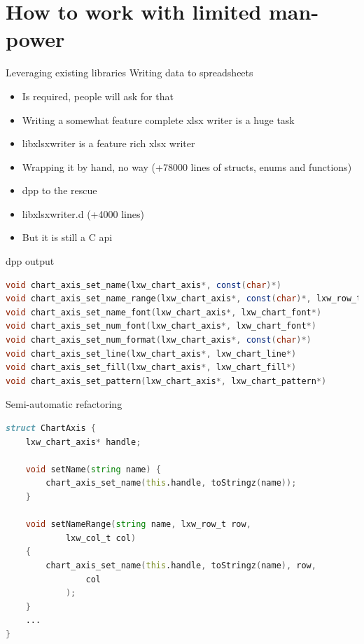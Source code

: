 \documentclass[aspectratio=169]{beamer}
\begin{document}
	\section{How to work with limited man-power}

	\begin{frame}{Leveraging existing libraries}
		\large
		Writing data to spreadsheets
		\pause
		\begin{itemize}
			\item Is required, people will ask for that
			\item Writing a somewhat feature complete xlsx writer is a huge task\\[1cm]
		\end{itemize}
		\begin{itemize}
			\item libxlsxwriter is a feature rich xlsx writer
			\item Wrapping it by hand, \pause no way (+78000 lines of structs, enums and functions)\\[1cm]
			\pause
			\item dpp to the rescue
			\item libxlsxwriter.d (+4000 lines)
			\item But it is still a C api
		\end{itemize}
	\end{frame}

	\begin{frame}[fragile]{dpp output}
		\begin{lstlisting}[language=D,basicstyle=\small\ttfamily]
void chart_axis_set_name(lxw_chart_axis*, const(char)*)
void chart_axis_set_name_range(lxw_chart_axis*, const(char)*, lxw_row_t, lxw_col_t)
void chart_axis_set_name_font(lxw_chart_axis*, lxw_chart_font*)
void chart_axis_set_num_font(lxw_chart_axis*, lxw_chart_font*)
void chart_axis_set_num_format(lxw_chart_axis*, const(char)*)
void chart_axis_set_line(lxw_chart_axis*, lxw_chart_line*)
void chart_axis_set_fill(lxw_chart_axis*, lxw_chart_fill*)
void chart_axis_set_pattern(lxw_chart_axis*, lxw_chart_pattern*)
\end{lstlisting}
	\end{frame}

	\begin{frame}[fragile]{Semi-automatic refactoring}
		\begin{lstlisting}[language=D]
struct ChartAxis {
	lxw_chart_axis* handle;

	void setName(string name) { 
		chart_axis_set_name(this.handle, toStringz(name)); 
	}

	void setNameRange(string name, lxw_row_t row, 
			lxw_col_t col) 
	{
		chart_axis_set_name(this.handle, toStringz(name), row, 
				col
			);
	}
	...
}
\end{lstlisting}
	\end{frame}
\end{document}
